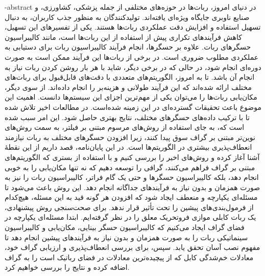 \fa-abstract{
در دنیای امروز، ربات‌ها در حوزه‌های مختلفی از جمله پزشکی، کشاورزی، و صنایع ناوبری جایگاه ویژه‌ای یافته‌اند. تولیدکنندگان به منظور جذب کاربران، به دنبال تسهیل استفاده و افزایش دقت عملکردی ربات‌ها هستند. یکی از تفسیرهای این تسهیل، کاهش فرآیندهای تکراری پیش از استفاده از این ربات‌ها است، مانند کالیبراسیون حسگرهای ربات. علاوه بر حسگرها، انجام فرآیند کالیبراسیون ربات برای دستیابی به عملکردی مطلوب ضروری است. در برخی از ربات‌ها این فرآیند ممکن است به صورت دوره‌ای انجام شود، در حالی که در برخی دیگر، شاید با هر بار روشن کردن ربات نیاز به انجام آن باشد.
تا به امروز، الگوریتم‌های متعددی با دقت‌های قابل‌قبول برای ربات‌های مختلف ارائه شده‌اند که این فرآیند طولانی و هزینه‌بر را انجام داده‌اند. از سوی دیگر، مکان‌یابی ربات‌ها را می‌توان یکی از مهم‌ترین اجزای این سیستم‌ها دانست. اهمیت این موضوع باعث تحقیقات گسترده‌ای در این زمینه شده‌است. در مطالعات اخیر تلاش شده تا با ترکیب داده‌های حسگرهای مختلف، نتایج بهتری حاصل شود.
این امر سبب شده است که، به جای استفاده از روش‌های مرسوم مبتنی بر فیلتر، به سمت روش‌های نوین‌تر مبتنی بر گراف سوق پیدا کنند، زیرا افزودن حسگرهای مختلف به ربات نیازمند انعطاف‌پذیری بیشتری در الگوریتم‌ها است. در این پایان‌نامه، قصد داریم از این نقطهٔ آشنا آغاز کرده و روش‌های اخیر را بررسی کنیم و با استفاده از بستری که الگوریتم‌های مبتنی بر گراف فراهم می‌کنند، گرافی را توسعه دهیم که نه تنها مکان‌یابی را به خوبی انجام دهد، بلکه کالیبراسیون حسگرها و حتی یک گام فراتر، کالیبراسیون ربات را نیز به صورت همزمان و بدون نیاز به فرآیندهای جداگانه انجام دهد.
این روش باعث می‌شود تا مسئله‌ای یکپارچه و منعطف ایجاد شود که افزودن هر گونه قید به این مسئله، هیچ‌کدام از فرمول‌بندی‌های پیشین را تحت تأثیر قرار ندهد. برای صحت‌سنجی روش پیشنهادی، یک ربات کابلی موازی فروتحریک معلق را در نظر گرفته‌ایم. ابتدا مسئله‌ای یکپارچه در فضای گراف ایجاد می‌کنیم که کالیبراسیون حسگر بینایی، مکان‌یابی و کالیبراسیون سینماتیکی ربات را به صورت همزمان و بدون نیاز به فرآیندهای پیشین انجام دهد تا مفهوم نصب آسان تحقق یابد. سپس، برای بررسی انعطاف‌پذیری و ارزیابی گراف خود، معادلات خم‌شدگی کابل که از پیچیده‌ترین معادلات در فضای رباتیک است را به گراف اضافه کرده و نتایج را بررسی خواهیم کرد.
}
